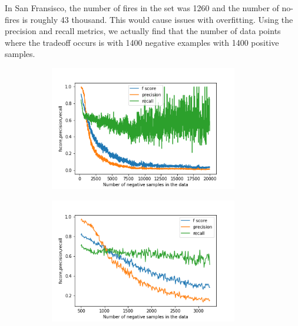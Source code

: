 \documentclass{article}
\begin{document}
In San Fransisco, the number of fires in the set was 1260 and the number of
no-fires is roughly 43 thousand. This would cause issues with overfitting.
Using the precision and recall metrics, we actually find that the number of
data points where the tradeoff occurs is with 1400 negative examples with 1400
positive samples.\par

\begin{figure}[H]
    \centering
    \begin{subfigure}[t]{0.45\textwidth}
        \includegraphics[width=0.9\textwidth]{image.png}
    \end{subfigure}
    \begin{subfigure}[t]{0.45\textwidth}
        \includegraphics[width=0.9\textwidth]{image1.png}
    \end{subfigure}
    \begin{subfigure}[t]{0.45\textwidth}

\end{subfigure}
\end{figure}
\end{document}
